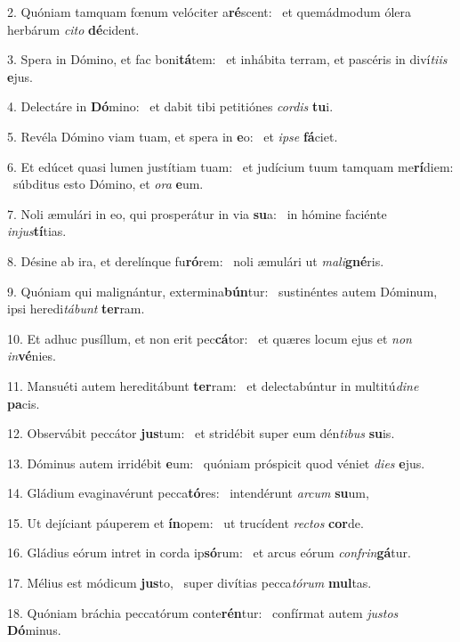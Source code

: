 2. Quóniam tamquam fœnum velóciter a\textbf{ré}scent: \ast\  et quemádmodum ólera herbárum \textit{ci}\textit{to} \textbf{dé}cident.\

3. Spera in Dómino, et fac boni\textbf{tá}tem: \ast\  et inhábita terram, et pascéris in diví\textit{ti}\textit{is} \textbf{e}jus.\

4. Delectáre in \textbf{Dó}mino: \ast\  et dabit tibi petitiónes \textit{cor}\textit{dis} \textbf{tu}i.\

5. Revéla Dómino viam tuam, et spera in \textbf{e}o: \ast\  et \textit{ip}\textit{se} \textbf{fá}ciet.\

6. Et edúcet quasi lumen justítiam tuam: \dag\  et judícium tuum tamquam me\textbf{rí}diem: \ast\  súbditus esto Dómino, et \textit{o}\textit{ra} \textbf{e}um.\

7. Noli æmulári in eo, qui prosperátur in via \textbf{su}a: \ast\  in hómine faciénte \textit{in}\textit{jus}\textbf{tí}tias.\

8. Désine ab ira, et derelínque fu\textbf{ró}rem: \ast\  noli æmulári ut \textit{ma}\textit{li}\textbf{gné}ris.\

9. Quóniam qui malignántur, extermina\textbf{bún}tur: \ast\  sustinéntes autem Dóminum, ipsi heredi\textit{tá}\textit{bunt} \textbf{ter}ram.\

10. Et adhuc pusíllum, et non erit pec\textbf{cá}tor: \ast\  et quæres locum ejus et \textit{non} \textit{in}\textbf{vé}nies.\

11. Mansuéti autem hereditábunt \textbf{ter}ram: \ast\  et delectabúntur in multitú\textit{di}\textit{ne} \textbf{pa}cis.\

12. Observábit peccátor \textbf{jus}tum: \ast\  et stridébit super eum dén\textit{ti}\textit{bus} \textbf{su}is.\

13. Dóminus autem irridébit \textbf{e}um: \ast\  quóniam próspicit quod véniet \textit{di}\textit{es} \textbf{e}jus.\

14. Gládium evaginavérunt pecca\textbf{tó}res: \ast\  intendérunt \textit{ar}\textit{cum} \textbf{su}um,\

15. Ut dejíciant páuperem et \textbf{ín}opem: \ast\  ut trucídent \textit{rec}\textit{tos} \textbf{cor}de.\

16. Gládius eórum intret in corda ip\textbf{só}rum: \ast\  et arcus eórum \textit{con}\textit{frin}\textbf{gá}tur.\

17. Mélius est módicum \textbf{jus}to, \ast\  super divítias pecca\textit{tó}\textit{rum} \textbf{mul}tas.\

18. Quóniam bráchia peccatórum conte\textbf{rén}tur: \ast\  confírmat autem \textit{jus}\textit{tos} \textbf{Dó}minus.\

